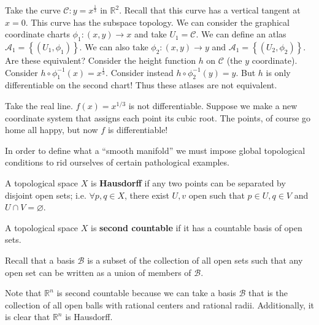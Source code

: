 \documentclass{../mathnotes}
\begin{document}
\begin{exmp}
    Take the curve $\mathcal{C}:y=x^{\frac{1}{3}}$ in $\mathbb{R}^2$. Recall that this curve has a vertical tangent at $x=0$. This curve has the subspace topology.
    We can consider the graphical coordinate charts $\phi_1:(x,y)\to x$ and take $U_1=\mathcal{C}$. We can define an atlas $\mathcal{A}_1=\left\{ \left( U_1,\phi_1 \right) \right\}$.
    We can also take $\phi_2:(x,y)\to y$ and $\mathcal{A}_1=\left\{ (U_2,\phi_2) \right\}$. Are these equivalent? Consider the height function $h$ on $\mathcal{C}$ (the $y$
    coordinate). Consider $h\circ\phi_1^{-1}(x)=x^{\frac{1}{3}}$. Consider instead $h\circ\phi_2^{-1}(y)=y$. But $h$ is only differentiable on the second chart!
    Thus these atlases are not equivalent.
\end{exmp}

\begin{exmp}
    Take the real line. $f(x)=x^{1/3}$ is not differentiable. Suppose we make a new coordinate system that assigns each point its cubic root. The points, of course go home
    all happy, but now $f$ is differentiable!
\end{exmp}

In order to define what a ``smooth manifold'' we must impose global topological conditions to rid ourselves of certain pathological examples.

\begin{defn}
    A topological space $X$ is \textbf{Hausdorff} if any two points can be separated by disjoint open sets; i.e. $\forall p,q\in X$, there exist $U,v$ open such that
    $p\in U, q\in V$ and $U\cap V=\varnothing$.
\end{defn}

\begin{defn}
    A topological space $X$ is \textbf{second countable} if it has a countable basis of open sets.
\end{defn}

Recall that a basis $\mathcal{B}$ is a subset of the collection of all open sets such that any open set can be written as a union of members of $\mathcal{B}$.

\begin{exmp}
    Note that $\mathbb{R}^n$ is second countable because we can take a basis $\mathcal{B}$ that is the collection of all open balls
    with rational centers and rational radii. Additionally, it is clear that $\mathbb{R}^n$ is Hausdorff.
\end{exmp}
\end{document}
